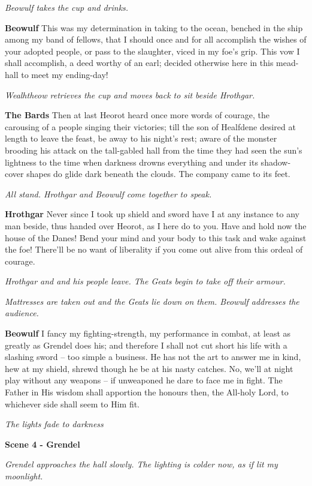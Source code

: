 \documentclass[a4paper]{article}
\begin{document}
{\centerline{\textit{Beowulf takes the cup and drinks.}}

\textbf{Beowulf} This was my determination in taking to the ocean,
benched in the ship among my band of fellows,
that I should once and for all accomplish the wishes
of your adopted people, or pass to the slaughter,
viced in my foe’s grip. This vow I shall accomplish,
a deed worthy of an earl; decided otherwise
here in this mead-hall to meet my ending-day!

\centerline{\textit{Wealhtheow retrieves the cup and moves back to sit beside Hrothgar.}}

\textbf{The Bards} Then at last Heorot heard once more
words of courage, the carousing of a people
singing their victories; till the son of Healfdene
desired at length to leave the feast,
be away to his night’s rest; aware of the monster
brooding his attack on the tall-gabled hall
from the time they had seen the sun’s lightness
to the time when darkness drowns everything
and under its shadow-cover shapes do glide
dark beneath the clouds. 
The company came to its feet.

\centerline{\textit{All stand. Hrothgar and Beowulf come together to speak.}}

\textbf{Hrothgar} Never since I took up shield and sword
have I at any instance to any man beside,
thus handed over Heorot, as I here do to you.
Have and hold now the house of the Danes!
Bend your mind and your body to this task
and wake against the foe! There’ll be no want of liberality
if you come out alive from this ordeal of courage.

\centerline{\textit{Hrothgar and and his people leave. The Geats begin to take off their armour.}}
\centerline{\textit{Mattresses are taken out and the Geats lie down on them. Beowulf addresses the audience.}}

\textbf{Beowulf} I fancy my fighting-strength, my performance in combat,
at least as greatly as Grendel does his;
and therefore I shall not cut short his life
with a slashing sword – too simple a business.
He has not the art to answer me in kind,
hew at my shield, shrewd though he be
at his nasty catches. No, we’ll at night play
without any weapons – if unweaponed he dare
to face me in fight. The Father in His wisdom
shall apportion the honours then, the All-holy Lord,
to whichever side shall seem to Him fit.

\centerline{\textit{The lights fade to darkness}}

\centerline{\textbf{Scene 4 - Grendel}}
\centerline{\textit{Grendel approaches the hall slowly. The lighting is colder now, as if lit my moonlight.}}

}
\end{document}
